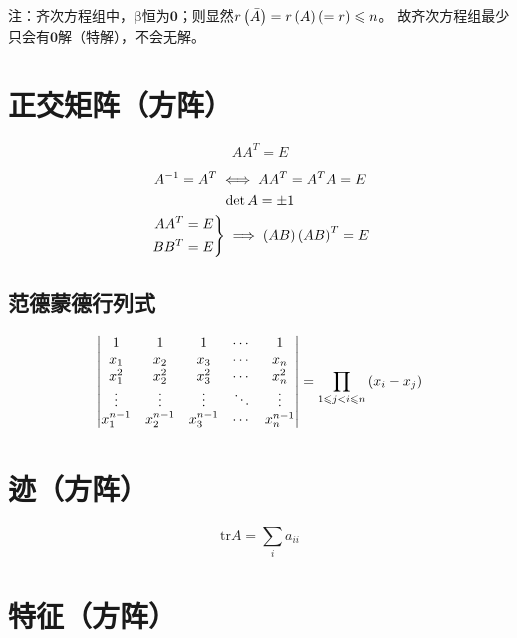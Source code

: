 \documentclass{article}
\begin{document}
注：齐次方程组中，$\boldsymbol{\mathrm\beta}$恒为$\boldsymbol0$；则显然$r\left(\bar A\right)=r\left(A\right)\left(=r\right)\leqslant n$。
故齐次方程组最少只会有$\boldsymbol0$解（特解），不会无解。

\section{正交矩阵（方阵）}

\begin{definition}
    \[AA^T=E\]
\end{definition}

\[\begin{gathered}
        A^{-1}=A^T\iff AA^T=A^TA=E\\
        \det A=\pm 1\\
        \left.\begin{aligned}
            AA^T & =E \\
            BB^T & =E
        \end{aligned}\right\}\implies\left(AB\right)\left(AB\right)^T=E
    \end{gathered}\]

\subsection{范德蒙德行列式}

\[\begin{vmatrix}
        1         & 1         & 1         & \cdots & 1         \\
        x_1       & x_2       & x_3       & \cdots & x_n       \\
        x_1^2     & x_2^2     & x_3^2     & \cdots & x_n^2     \\
        \vdots    & \vdots    & \vdots    & \ddots & \vdots    \\
        x_1^{n-1} & x_2^{n-1} & x_3^{n-1} & \cdots & x_n^{n-1} \\
    \end{vmatrix}
    =\prod_{1\leqslant j<i\leqslant n}\left(x_i-x_j\right)\]

\section{迹（方阵）}

\[\mathrm{tr}A=\sum_ia_{ii}\]

\section{特征（方阵）}
\end{document}
